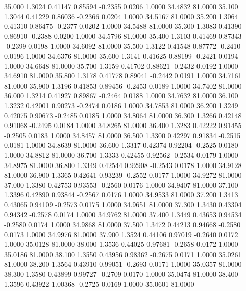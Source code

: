   35.000   1.3024   0.41147   0.85594  -0.2355   0.0206   1.0000  34.4832  81.0000
  35.100   1.3044   0.41229   0.86036  -0.2366   0.0204   1.0000  34.5167  81.0000
  35.200   1.3064   0.41310   0.86475  -0.2377   0.0202   1.0000  34.5488  81.0000
  35.300   1.3083   0.41390   0.86910  -0.2388   0.0200   1.0000  34.5796  81.0000
  35.400   1.3103   0.41469   0.87343  -0.2399   0.0198   1.0000  34.6092  81.0000
  35.500   1.3122   0.41548   0.87772  -0.2410   0.0196   1.0000  34.6376  81.0000
  35.600   1.3141   0.41625   0.88199  -0.2421   0.0194   1.0000  34.6648  81.0000
  35.700   1.3159   0.41702   0.88621  -0.2432   0.0192   1.0000  34.6910  81.0000
  35.800   1.3178   0.41778   0.89041  -0.2442   0.0191   1.0000  34.7161  81.0000
  35.900   1.3196   0.41853   0.89456  -0.2453   0.0189   1.0000  34.7402  81.0000
  36.000   1.3214   0.41927   0.89867  -0.2464   0.0188   1.0000  34.7632  81.0000
  36.100   1.3232   0.42001   0.90273  -0.2474   0.0186   1.0000  34.7853  81.0000
  36.200   1.3249   0.42075   0.90673  -0.2485   0.0185   1.0000  34.8064  81.0000
  36.300   1.3266   0.42148   0.91068  -0.2495   0.0184   1.0000  34.8265  81.0000
  36.400   1.3283   0.42222   0.91455  -0.2505   0.0183   1.0000  34.8457  81.0000
  36.500   1.3300   0.42297   0.91834  -0.2515   0.0181   1.0000  34.8639  81.0000
  36.600   1.3317   0.42374   0.92204  -0.2525   0.0180   1.0000  34.8812  81.0000
  36.700   1.3333   0.42455   0.92562  -0.2534   0.0179   1.0000  34.8975  81.0000
  36.800   1.3349   0.42544   0.92908  -0.2543   0.0178   1.0000  34.9128  81.0000
  36.900   1.3365   0.42641   0.93239  -0.2552   0.0177   1.0000  34.9272  81.0000
  37.000   1.3380   0.42753   0.93553  -0.2560   0.0176   1.0000  34.9407  81.0000
  37.100   1.3396   0.42890   0.93844  -0.2567   0.0176   1.0000  34.9533  81.0000
  37.200   1.3413   0.43065   0.94109  -0.2573   0.0175   1.0000  34.9651  81.0000
  37.300   1.3430   0.43304   0.94342  -0.2578   0.0174   1.0000  34.9762  81.0000
  37.400   1.3449   0.43653   0.94534  -0.2580   0.0174   1.0000  34.9868  81.0000
  37.500   1.3472   0.44213   0.94668  -0.2580   0.0173   1.0000  34.9976  81.0000
  37.900   1.3524   0.44106   0.97019  -0.2640   0.0172   1.0000  35.0128  81.0000
  38.000   1.3536   0.44025   0.97681  -0.2658   0.0172   1.0000  35.0186  81.0000
  38.100   1.3550   0.43956   0.98362  -0.2675   0.0171   1.0000  35.0261  81.0000
  38.200   1.3564   0.43910   0.99051  -0.2693   0.0171   1.0000  35.0357  81.0000
  38.300   1.3580   0.43899   0.99727  -0.2709   0.0170   1.0000  35.0474  81.0000
  38.400   1.3596   0.43922   1.00368  -0.2725   0.0169   1.0000  35.0601  81.0000
